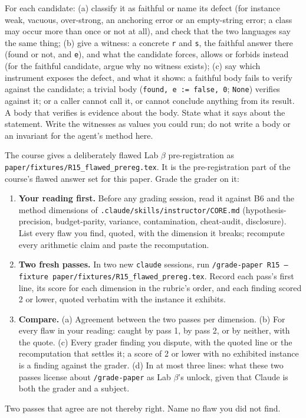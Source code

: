 \documentclass[11pt]{article}
\begin{document}
\begin{problem}
For each candidate: (a) classify it as faithful or name its defect (for
instance weak, vacuous, over-strong, an anchoring error or an empty-string
error; a class may occur more than once or not at all), and check that the two
languages say the same thing; (b) give a witness: a concrete \texttt{r} and
\texttt{s}, the faithful answer there (found or not, and \texttt{e}), and what
the candidate forces, allows or forbids instead (for the faithful candidate,
argue why no witness exists); (c) say which instrument exposes the defect, and
what it shows: a faithful body fails to verify against the candidate; a trivial
body (\texttt{found, e := false, 0}; \texttt{None}) verifies against it; or a
caller cannot call it, or cannot conclude anything from its result. A body
that verifies is evidence about the body. State what it says about the
statement. Write the witnesses as values you could run; do not write a body
or an invariant for the agent's method here.
\end{problem}

\begin{problem}\label{prob:B4}
The course gives a deliberately flawed Lab $\beta$ pre-registration as
\texttt{paper/fixtures/R15\_flawed\_prereg.tex}. It is the pre-registration
part of the course's flawed answer set for this paper. Grade the grader on it:
\begin{enumerate}
\item \textbf{Your reading first.} Before any grading session, read it against
B6 and the method dimensions of \texttt{.claude/skills/instructor/CORE.md}
(hypothesis-precision, budget-parity, variance, contamination, cheat-audit,
disclosure). List every flaw you find, quoted, with the dimension it breaks;
recompute every arithmetic claim and paste the recomputation.
\item \textbf{Two fresh passes.} In two new \texttt{claude} sessions, run
\texttt{/grade-paper R15 --fixture paper/fixtures/R15\_flawed\_prereg.tex}. Record
each pass's first line, its score for each dimension in the rubric's order,
and each finding scored 2 or lower, quoted verbatim with the instance it
exhibits.
\item \textbf{Compare.} (a) Agreement between the two passes per dimension.
(b) For every flaw in your reading: caught by pass 1, by pass 2, or by neither,
with the quote. (c) Every grader finding you dispute, with the quoted line or
the recomputation that settles it; a score of 2 or lower with no exhibited
instance is a finding against the grader. (d) In at most three lines: what
these two passes license about \texttt{/grade-paper} as Lab $\beta$'s unlock,
given that Claude is both the grader and a subject.
\end{enumerate}
Two passes that agree are not thereby right. Name no flaw you did not find.
\end{problem}
\end{document}
